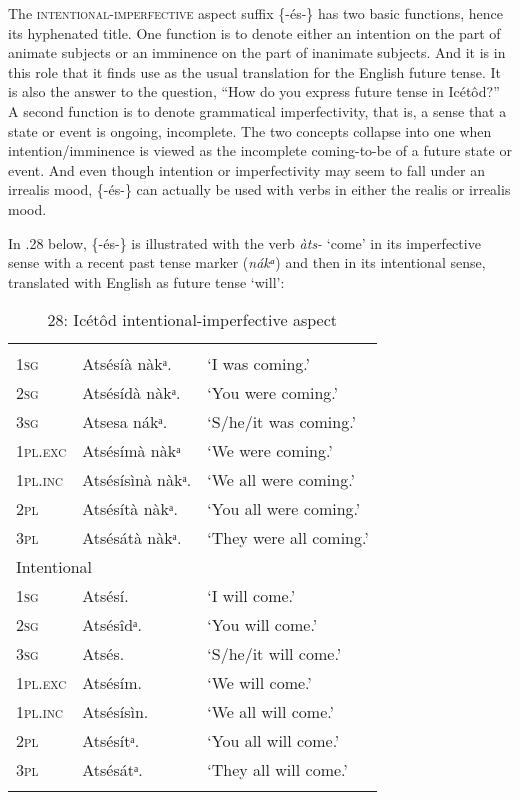 The \textsc{intentional-imperfective} aspect suffix \{-és-\} has two basic functions, hence its hyphenated title. One function is to denote either an intention on the part of animate subjects or an imminence on the part of inanimate subjects. And it is in this role that it finds use as the usual translation for the English future tense. It is also the answer to the question, “How do you express future tense in Icétôd?” A second function is to denote grammatical imperfectivity, that is, a sense that a state or event is ongoing, incomplete. The two concepts collapse into one when intention/imminence is viewed as the incomplete coming-to-be of a future state or event.  And even though intention or imperfectivity may seem to fall under an irrealis mood, \{-és-\} can actually be used with verbs in either the realis or irrealis mood. 

In .28 below, \{-és-\} is illustrated with the verb \textit{àts-} ‘come’ in its imperfective sense with a recent past tense marker (\textit{nákᵃ}) and then in its intentional sense, translated with English as future tense ‘will’:


\begin{table}
\caption{28: Icétôd intentional-imperfective aspect}
\label{tab:8}


\begin{tabularx}{\textwidth}{XXX}
\lsptoprule

\multicolumn{2}{X}{Imperfective} & \\
\textsc{1sg} & Atsésíà nàkᵃ. & ‘I was coming.’\\
\textsc{2sg} & Atsésídà nàkᵃ. & ‘You were coming.’\\
\textsc{3sg} & Atsesa nákᵃ. & ‘S/he/it was coming.’\\
\textsc{1pl.exc} & Atsésímà nàkᵃ & ‘We were coming.’\\
\textsc{1pl.inc} & Atsésísìnà nàkᵃ. & ‘We all were coming.’\\
\textsc{2pl} & Atsésítà nàkᵃ. & ‘You all were coming.’\\
\textsc{3pl} & Atsésátà nàkᵃ. & ‘They were all coming.’\\
\multicolumn{2}{X}{Intentional} & \\
\textsc{1sg} & Atsésí. & ‘I will come.’\\
\textsc{2sg} & Atsésîdᵃ. & ‘You will come.’\\
\textsc{3sg} & Atsés. & ‘S/he/it will come.’\\
\textsc{1pl.exc} & Atsésím. & ‘We will come.’\\
\textsc{1pl.inc} & Atsésísìn. & ‘We all will come.’\\
\textsc{2pl} & Atsésítᵃ. & ‘You all will come.’\\
\textsc{3pl} & Atsésátᵃ. & ‘They all will come.’\\
\lspbottomrule
\end{tabularx}
\end{table}

